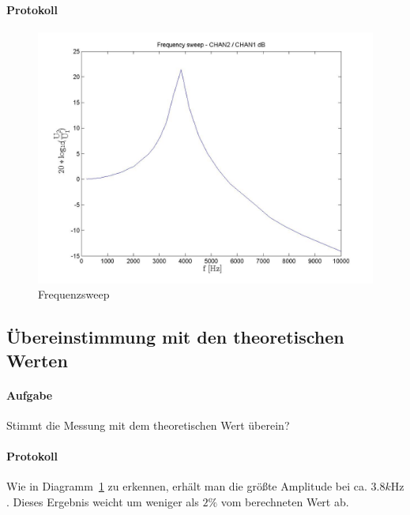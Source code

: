\documentclass[10pt]{scrreprt}
\begin{document}
        \paragraph{Protokoll}
        \begin{center}
            \begin{figure}[H]
                \includegraphics[width=\textwidth]{F_Sweep_1_frequencysweep_ylogxlin.jpg}
                \caption{Frequenzsweep}
                \label{fig:fsweep1}
            \end{figure}
        \end{center}
        \subsection{Übereinstimmung mit den theoretischen Werten}
        \paragraph{Aufgabe}
        Stimmt die Messung mit dem theoretischen Wert überein?

        \paragraph{Protokoll}
        Wie in Diagramm~\ref{fig:fsweep1} zu erkennen, erhält man die größte Amplitude bei
        ca. $3.8 \si{k\hertz}$. Dieses Ergebnis weicht um weniger als $2\%$ vom berechneten
        Wert ab.
\end{document}
